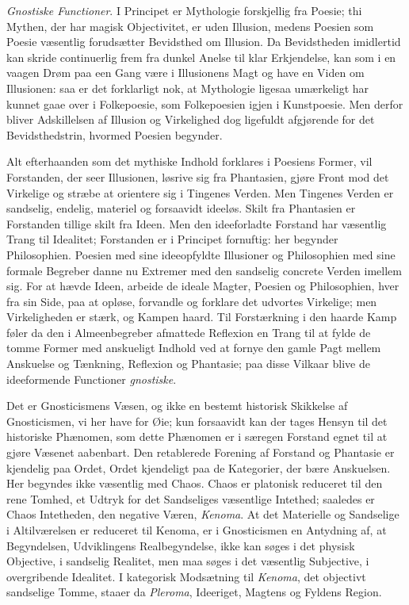 \documentclass[12pt]{book}
\newcommand{\opage}[1]{\marginnote{\footnotesize\textit{[#1]}}}
\begin{document}
\emph{Gnostiske Functioner}. I Principet er Mythologie
forskjellig fra Poesie; thi Mythen, der har magisk Objectivitet,
er uden Illusion, medens Poesien som Poesie væsentlig forudsætter
Bevidsthed om Illusion. Da Bevidstheden imidlertid
kan skride continuerlig frem fra dunkel Anelse til klar Erkjendelse,
kan som i en vaagen Drøm paa een Gang være
i Illusionens Magt og have en Viden om Illusionen: saa er
det forklarligt nok, at Mythologie ligesaa umærkeligt har kunnet
gaae over i Folkepoesie, som Folkepoesien igjen i Kunstpoesie.
Men derfor bliver Adskillelsen af Illusion og Virkelighed dog
\opage{81}ligefuldt afgjørende for det Bevidsthedstrin, hvormed Poesien
begynder.

Alt efterhaanden som det mythiske Indhold forklares i
Poesiens Former, vil Forstanden, der seer Illusionen, løsrive
sig fra Phantasien, gjøre Front mod det Virkelige og
stræbe at orientere sig i Tingenes Verden. Men Tingenes
Verden er sandselig, endelig, materiel og forsaavidt ideeløs.
Skilt fra Phantasien er Forstanden tillige skilt fra Ideen.
Men den ideeforladte Forstand har væsentlig Trang til Idealitet;
Forstanden er i Principet fornuftig: her begynder Philosophien.
Poesien med sine ideeopfyldte Illusioner og Philosophien
med sine formale Begreber danne nu Extremer med
den sandselig concrete Verden imellem sig. For at hævde
Ideen, arbeide de ideale Magter, Poesien og Philosophien, hver
fra sin Side, paa at opløse, forvandle og forklare det udvortes
Virkelige; men Virkeligheden er stærk, og Kampen haard.
Til Forstærkning i den haarde Kamp føler da den i Almeenbegreber
afmattede Reflexion en Trang til at fylde de tomme
Former med anskueligt Indhold ved at fornye den gamle Pagt
mellem Anskuelse og Tænkning, Reflexion og Phantasie; paa
disse Vilkaar blive de ideeformende Functioner \emph{gnostiske}.

Det er Gnosticismens Væsen, og ikke en bestemt historisk
Skikkelse af Gnosticismen, vi her have for Øie; kun forsaavidt
kan der tages Hensyn til det historiske Phænomen, som dette
Phænomen er i særegen Forstand egnet til at gjøre Væsenet
aabenbart. Den retablerede Forening af Forstand og Phantasie
er kjendelig paa Ordet, Ordet kjendeligt paa de Kategorier,
der bære Anskuelsen. Her begyndes ikke væsentlig med Chaos.
Chaos er platonisk reduceret til den rene Tomhed, et Udtryk
for det Sandseliges væsentlige Intethed; saaledes er Chaos
Intetheden, den negative Væren, \emph{Kenoma}. At det Materielle
og Sandselige i Altilværelsen er reduceret til Kenoma,
er i Gnosticismen en Antydning af, at Begyndelsen, Udviklingens
Realbegyndelse, ikke kan søges i det physisk Objective, i
\opage{82}sandselig Realitet, men maa søges i det væsentlig Subjective,
i overgribende Idealitet. I kategorisk Modsætning til \emph{Kenoma},
det objectivt sandselige Tomme, staaer da \emph{Pleroma},
Ideeriget, Magtens og Fyldens Region.
\end{document}
